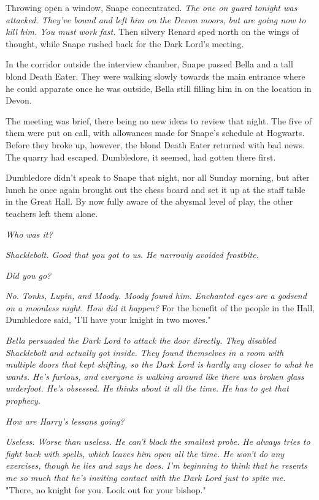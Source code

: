 Throwing open a window, Snape concentrated. \emph{The one on guard tonight was attacked. They've bound and left him on the Devon moors, but are going now to kill him. You must work fast.} Then silvery Renard sped north on the wings of thought, while Snape rushed back for the Dark Lord's meeting.

In the corridor outside the interview chamber, Snape passed Bella and a tall blond Death Eater. They were walking slowly towards the main entrance where he could apparate once he was outside, Bella still filling him in on the location in Devon.

The meeting was brief, there being no new ideas to review that night. The five of them were put on call, with allowances made for Snape's schedule at Hogwarts. Before they broke up, however, the blond Death Eater returned with bad news. The quarry had escaped. Dumbledore, it seemed, had gotten there first.

Dumbledore didn't speak to Snape that night, nor all Sunday morning, but after lunch he once again brought out the chess board and set it up at the staff table in the Great Hall. By now fully aware of the abysmal level of play, the other teachers left them alone.

\emph{Who was it?}

\emph{Shacklebolt. Good that you got to us. He narrowly avoided frostbite.}

\emph{Did you go?}

\emph{No. Tonks, Lupin, and Moody. Moody found him. Enchanted eyes are a godsend on a moonless night. How did it happen?} For the benefit of the people in the Hall, Dumbledore said, "I'll have your knight in two moves."

\emph{Bella persuaded the Dark Lord to attack the door directly. They disabled Shacklebolt and actually got inside. They found themselves in a room with multiple doors that kept shifting, so the Dark Lord is hardly any closer to what he wants. He's furious, and everyone is walking around like there was broken glass underfoot. He's obsessed. He thinks about it all the time. He has to get that prophecy.}

\emph{How are Harry's lessons going?}

\emph{Useless. Worse than useless. He can't block the smallest probe. He always tries to fight back with spells, which leaves him open all the time. He won't do any exercises, though he lies and says he does. I'm beginning to think that he resents me so much that he's inviting contact with the Dark Lord just to spite me.} "There, no knight for you. Look out for your bishop."

